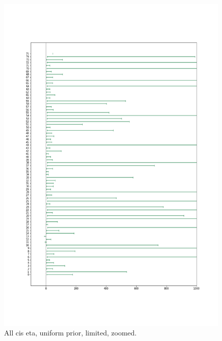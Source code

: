 \begin{figure}
    \centering
    \includegraphics[scale=0.37]{pictures/all_cis_lim_eta_zoomed.png}
    \caption{All cis eta, uniform prior, limited, zoomed.}
    \label{fig:all_cis_eta_lim_zoomed}
\end{figure}

